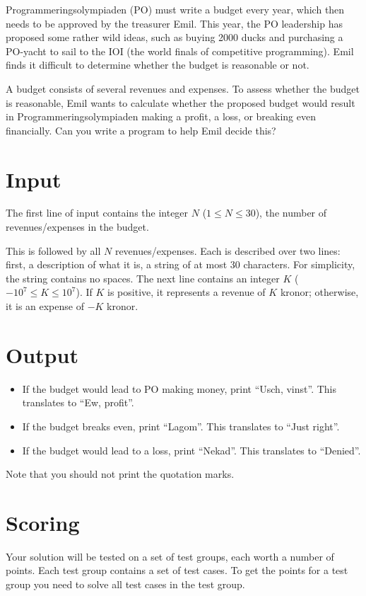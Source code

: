 
Programmeringsolympiaden (PO) must write a budget every year, which then needs to be approved by the
treasurer Emil. This year, the PO leadership has proposed some rather wild ideas, such as buying
2000 ducks and purchasing a PO-yacht to sail to the IOI (the world finals of competitive programming).
Emil finds it difficult to determine whether the budget is reasonable or not.

A budget consists of several revenues and expenses.
To assess whether the budget is reasonable, Emil wants to calculate whether the proposed budget would
result in Programmeringsolympiaden making a profit, a loss, or breaking even financially. Can you write
a program to help Emil decide this?

\section*{Input}
The first line of input contains the integer $N$ ($1 \leq N \leq 30$), the number of revenues/expenses in the budget.

This is followed by all $N$ revenues/expenses. Each is described over two lines: first, a description of what it is,
a string of at most 30 characters. For simplicity, the string contains no spaces.  
The next line contains an integer $K$ ($-10^7 \leq K \leq 10^7$). If $K$ is positive, it represents a revenue of $K$ kronor;
otherwise, it is an expense of $-K$ kronor.

\section*{Output}
\begin{itemize}
  \item If the budget would lead to PO making money, print ``Usch, vinst''. This translates to ``Ew, profit''.
  \item If the budget breaks even, print ``Lagom''. This translates to ``Just right''.
  \item If the budget would lead to a loss, print ``Nekad''. This translates to ``Denied''.
\end{itemize}
Note that you should not print the quotation marks.

\section*{Scoring}
Your solution will be tested on a set of test groups, each worth a number of points. Each test group contains
a set of test cases. To get the points for a test group you need to solve all test cases in the test group.


